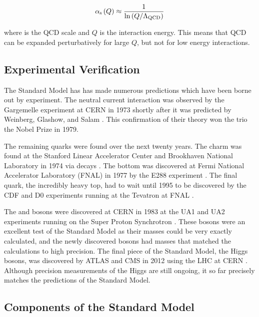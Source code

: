 \begin{equation}\label{eq:alpha_strong}
    \alpha_{\text{s}} \left( Q \right)
    \approx
    \frac{1}{
        {\mathrm{ln}} \left( Q / \Lambda_{\text{QCD}} \right)
    }
\end{equation}

where \LambdaQCD is the QCD scale and $Q$ is the interaction energy. This means
that QCD can be expanded perturbatively for large $Q$, but not for low energy
interactions.

\subsection{Experimental Verification}

The Standard Model has has made numerous predictions which have been borne out
by experiment. The neutral current interaction was observed by the Gargemelle
experiment at CERN in 1973 shortly after it was predicted by Weinberg, Glashow,
and Salam \cite{hasert1973}. This confirmation of their theory won the trio the
Nobel Prize in 1979.

The remaining quarks were found over the next twenty years. The charm was found
at the Stanford Linear Accelerator Center and Brookhaven National Laboratory in
1974 via \jpsi decays \cite{aubert1974}\cite{augustin1974}. The bottom was
discovered at Fermi National Accelerator Laboratory (FNAL) in 1977 by the E288
experiment \cite{herb1977}. The final quark, the incredibly heavy top, had to
wait until 1995 to be discovered by the CDF and D0 experiments running at the
Tevatron at FNAL \cite{cdf1995}\cite{d01995}.

The \W and \Z bosons were discovered at CERN in 1983 at the UA1 and UA2
experiments running on the Super Proton Synchrotron
\cite{ua1_w}\cite{ua2_w}\cite{ua1_z}\cite{ua2_z}. These bosons were an
excellent test of the Standard Model as their masses could be very exactly
calculated, and the newly discovered bosons had masses that matched the
calculations to high precision. The final piece of the Standard Model, the
Higgs bosons, was discovered by ATLAS and CMS in 2012 using the LHC at CERN
\cite{atlas_higgs}\cite{cms_higgs}. Although precision measurements of the
Higgs are still ongoing, it so far precisely matches the predictions of the
Standard Model.

\subsection{Components of the Standard Model}

